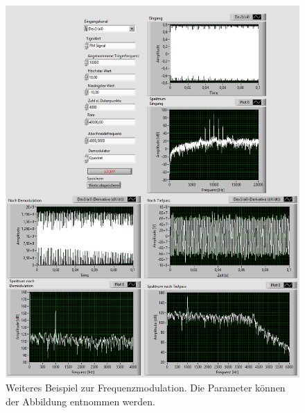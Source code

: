 \begin{figure}[H]
	\centering
	\includegraphics[width=1\textwidth]{pic/FM10k1k001.png}
	\caption{Weiteres Beispiel zur Frequenzmodulation. Die Parameter können der Abbildung entnommen werden.}
	\label{fig:a15}	
\end{figure} 

